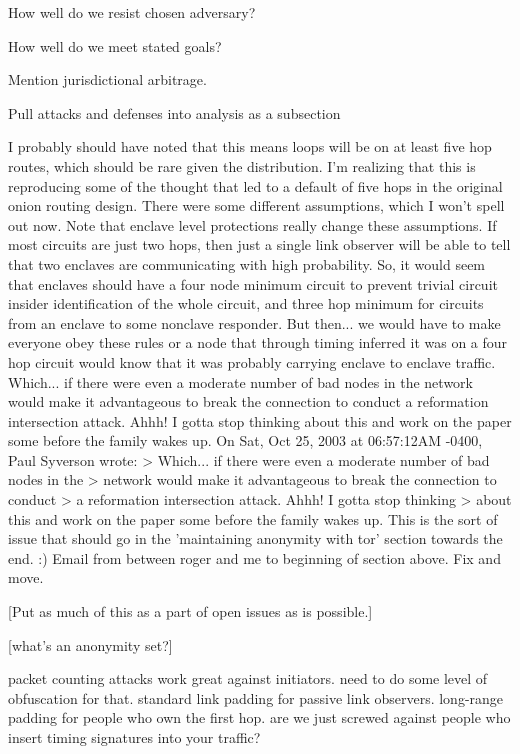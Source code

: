 \documentclass[times,10pt,twocolumn]{article}
\begin{document}
How well do we resist chosen adversary?

How well do we meet stated goals?

Mention jurisdictional arbitrage.

Pull attacks and defenses into analysis as a subsection

\label{sec:maintaining-anonymity}

I probably should have noted that this means loops will be on at least
five hop routes, which should be rare given the distribution.  I'm    
realizing that this is reproducing some of the thought that led to a  
default of five hops in the original onion routing design.  There were
some different assumptions, which I won't spell out now.  Note that   
enclave level protections really change these assumptions.  If most   
circuits are just two hops, then just a single link observer will be  
able to tell that two enclaves are communicating with high probability.
So, it would seem that enclaves should have a four node minimum circuit
to prevent trivial circuit insider identification of the whole circuit,
and three hop minimum for circuits from an enclave to some nonclave    
responder. But then... we would have to make everyone obey these rules 
or a node that through timing inferred it was on a four hop circuit    
would know that it was probably carrying enclave to enclave traffic.   
Which... if there were even a moderate number of bad nodes in the      
network would make it advantageous to break the connection to conduct  
a reformation intersection attack. Ahhh! I gotta stop thinking         
about this and work on the paper some before the family wakes up.  
On Sat, Oct 25, 2003 at 06:57:12AM -0400, Paul Syverson wrote:
> Which... if there were even a moderate number of bad nodes in the
> network would make it advantageous to break the connection to conduct         > a reformation intersection attack. Ahhh! I gotta stop thinking                > about this and work on the paper some before the family wakes up.             
This is the sort of issue that should go in the 'maintaining anonymity
with tor' section towards the end. :)
Email from between roger and me to beginning of section above. Fix and move.


[Put as much of this as a part of open issues as is possible.]

[what's an anonymity set?]

packet counting attacks work great against initiators. need to do some
level of obfuscation for that. standard link padding for passive link
observers. long-range padding for people who own the first hop. are
we just screwed against people who insert timing signatures into your
traffic?
\end{document}
